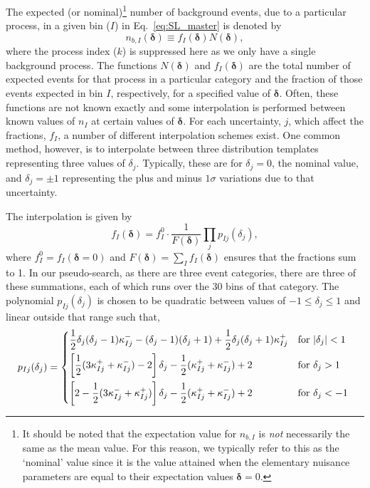 \documentclass[11pt]{article}
\begin{document}
The expected (or nominal)\footnote{It should be noted that the expectation value for $n_{b,I}$ is \emph{not} necessarily the same as the mean value. For this reason, we typically refer
to this as the `nominal' value since it is the value attained when the elementary nuisance parameters are equal to their expectation values $\mathbf{\delta}=0$.} number of background events, due to a particular process, in a given bin ($I$) in  
Eq.~\eqref{eq:SL_master} is denoted by
%
\begin{equation}
  n_{b,I}(\bm{\delta}) \equiv %
  f_{I}(\bm{\delta}) N(\bm{\delta}),
\end{equation}
%
where the process index ($k$) is suppressed here as we only have a single background process. The functions $N(\bm{\delta})$ and  $f_{I}(\bm{\delta})$ are the total number of expected events for that process in a particular
category and the fraction of those events expected in bin $I$, respectively, for a specified value of $\bm{\delta}$. Often, these functions are not known exactly and some interpolation is performed between known
values of $n_{I}$ at certain values of $\bm{\delta}$. For each uncertainty, $j$, which affect the fractions, $f_{I}$, a number of different interpolation schemes exist. One common method, however, is to interpolate between
three distribution templates representing three values of $\delta_{j}$. Typically, these are for $\delta_{j}=0$, the nominal value, and $\delta_{j}=\pm1$ representing the plus and minus $1\sigma$ variations due to that uncertainty.

The interpolation is given by
%
\begin{equation}
 f_{I}(\bm{\delta}) = f_{I}^{0}\cdot\frac{1}{F(\bm{\delta})} \prod_{j} p_{Ij}(\delta_{j}),
 \label{eqn:frac_function}
\end{equation}
%
where $f_{I}^{0}=f_{I}(\bm{\delta}=0)$ and $F(\bm{\delta})=\sum_{I}f_{I}(\bm{\delta})$ ensures that the fractions sum to 1. In our pseudo-search, as there are three event categories,
there are three of these summations, each of which runs over the 30 bins of that category. The polynomial $p_{Ij}(\delta_{j})$ is chosen to be quadratic between values of $-1 \leq \delta_{j} \leq 1$
and linear outside that range such that,
\begin{equation}
 p_{Ij}(\delta_{j}) = \begin{dcases*}
 		\frac{1}{2} \delta_{j}(\delta_{j}-1) \kappa_{Ij}^{-}  -(\delta_{j}-1)(\delta_{j}+1) + \frac{1}{2}\delta_{j}(\delta_{j}+1)\kappa_{Ij}^{+} & for $|\delta_{j}|<1$ \\
        \left[ \frac{1}{2}(3\kappa_{Ij}^{+} + \kappa_{Ij}^{-})-2\right]\delta_{j} - \frac{1}{2}(\kappa_{Ij}^{+}+\kappa_{Ij}^{-})+2 & for $\delta_{j}>1$ \\
         \left[2-\frac{1}{2}(3\kappa_{Ij}^{-} + \kappa_{Ij}^{+})\right]\delta_{j} - \frac{1}{2}(\kappa_{Ij}^{+}+\kappa_{Ij}^{-})+2 & for $\delta_{j}<-1$ \\
    \end{dcases*}
\end{equation}
\end{document}
